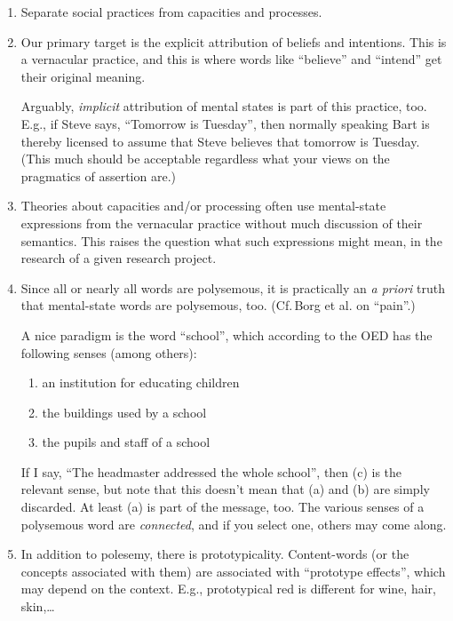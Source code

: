 \documentclass[12pt,a4paper]{article}
\newcommand{\E}[1]{\emph{#1}}
\newcommand{\Q}[1]{``#1''}
\begin{document}
\begin{enumerate}\itemsep=0ex

\item Separate social practices from capacities and processes.

\item Our primary target is the explicit attribution of beliefs and intentions. This is a vernacular practice, and this is where words like \Q{believe} and \Q{intend} get their original meaning.
\par Arguably, \E{implicit} attribution of mental states is part of this practice, too. E.g., if Steve says, \Q{Tomorrow is Tuesday}, then normally speaking Bart is thereby licensed to assume that Steve believes that tomorrow is Tuesday. (This much should be acceptable regardless what your views on the pragmatics of assertion are.)

\item Theories about capacities and/or processing often use mental-state expressions from the vernacular practice without much discussion of their semantics. This raises the question what such expressions might mean, in the research of a given research project.

\item Since all or nearly all words are polysemous, it is practically an \E{a priori} truth that mental-state words are polysemous, too. (Cf.\,Borg et al. on \Q{pain}.)
\par A nice paradigm is the word \Q{school}, which according to the OED has the following senses (among others):
\begin{enumerate}\itemsep=0ex
\item an institution for educating children
\item the buildings used by a school
\item the pupils and staff of a school
\end{enumerate}
If I say, \Q{The headmaster addressed the whole school}, then (c) is the relevant sense, but note that this doesn't mean that (a) and (b) are simply discarded. At least (a) is part of the message, too. The various senses of a polysemous word are \E{connected}, and if you select one, others may come along.

\item In addition to polesemy, there is prototypicality. Content-words (or the concepts associated with them) are associated with \Q{prototype effects}, which may depend on the context. E.g., prototypical red is different for wine, hair, skin,\ldots

\end{enumerate}
\end{document}
